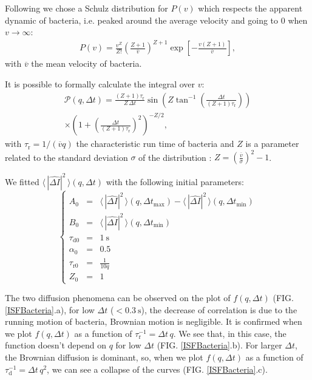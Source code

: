 \documentclass[%
 aip,
 jmp,%
 amsmath,amssymb,
reprint,%
]{revtex4-1}
\begin{document}
Following\citep{1_BactMobil} we chose a Schulz distribution for $P(v)$ which respects the apparent dynamic of bacteria, i.e. peaked around the average velocity and going to 0 when $v \rightarrow \infty$:
\begin{multline}
P(v) = \frac{v^Z}{Z!} \left(\frac{Z+1}{\overline{v}}\right)^{Z+1} \exp\left[-\frac{v(Z+1)}{\overline{v}}\right],
\end{multline}
with $\overline{v}$ the mean velocity of bacteria.

It is possible to formally calculate the integral over $v$:
\begin{multline}
\mathcal{P}(q, \Delta t) = \frac{(Z+1)\tau_\text{r}}{Z \, \Delta t} \sin\left(Z\tan^{-1}\left(\frac{\Delta t}{(Z+1)\tau_\text{r}}\right)\right)\\
\times \left(1+\left(\frac{\Delta t}{(Z+1)\tau_\text{r}}\right)^2\right)^{-Z/2},
\end{multline}
with $\tau_\text{r} = 1/(\overline{v}q)$ the characteristic run time of bacteria and $Z$ is a parameter related to the standard deviation $\sigma$ of the distribution : $Z = \left( \frac{\overline{v}}{\sigma} \right)^2 -1$. 

We fitted $\langle \, |\widehat{\Delta I}|^2 \, \rangle (q, \Delta t)$ with the following initial parameters:
\begin{equation}
\left\{
\begin{array}{rcl}
A_0 &=& \langle \, |\widehat{\Delta I}|^2 \, \rangle (q,\Delta t_\text{max}) - \langle \, |\widehat{\Delta I}|^2 \, \rangle (q,\Delta t_\text{min}) \\
B_0 &=& \langle \, |\widehat{\Delta I}|^2 \, \rangle (q,\Delta t_\text{min}) \\
\tau_\text{d0} &=& \SI{1}{\second}\\
\alpha_0 &=& 0.5\\
\tau_\text{r0} &=& \frac{1}{10 q}\\
Z_0 &=& 1
\end{array}
\right.
\end{equation}

The two diffusion phenomena can be observed on the plot of $f(q, \Delta t)$ (FIG. \ref{ISFBacteria}.a), for low $\Delta t$ ($< \SI{0.3}{\second}$), the decrease of correlation is due to the running motion of bacteria, Brownian motion is negligible. It is confirmed when we plot $f(q, \Delta t)$ as a function of $\tau_\text{r}^{-1} = \Delta t \, q$. We see that, in this case, the function doesn't depend on $q$ for low $\Delta t$ (FIG. \ref{ISFBacteria}.b). For larger $\Delta t$, the Brownian diffusion is dominant, so, when we plot $f(q, \Delta t)$ as a function of $\tau_\text{d}^{-1} = \Delta t \, q^2$, we can see a collapse of the curves (FIG. \ref{ISFBacteria}.c).
\end{document}
